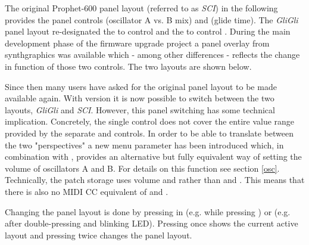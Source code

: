 The original Prophet-600 panel layout (referred to as \textit{SCI}) in the following provides the panel controls \mixer (oscillator A vs. B mix) and \glidepot (glide time). The \textit{GliGli} panel layout re-designated the \mixer to control \vola and the \glidepot to control \volb. During the main development phase of the firmware upgrade project a panel overlay from synthgraphics \cite{synthgraphics} was available which - among other differences - reflects the change in function of those two controls. The two layouts are shown below. 


Since then many users have asked for the original panel layout to be made available again. With version \version it is now possible to switch between the two layouts, \textit{GliGli} and \textit{SCI}. However, this panel switching has some technical implication. Concretely, the single \mixer control does not cover the entire value range provided by the separate \vola and \volb controls. In order to be able to translate between the two "perspectives" a new menu parameter \drive has been introduced which, in combination with \mixer, provides an alternative but fully equivalent way of setting the volume of oscillators A and B. For details on this function see section \ref{osc}. Technically, the patch storage uses volume \vola and \volb rather than \mixer and \drive. This means that there is also no MIDI CC equivalent of \mixer and \drive.

Changing the panel layout is done by pressing  in \shiftmode (e.g. while pressing \fromtape) or \shiftlock (e.g. after double-pressing \fromtape and blinking \fromtape LED). Pressing  once shows the current active layout and pressing  twice changes the panel layout. 


